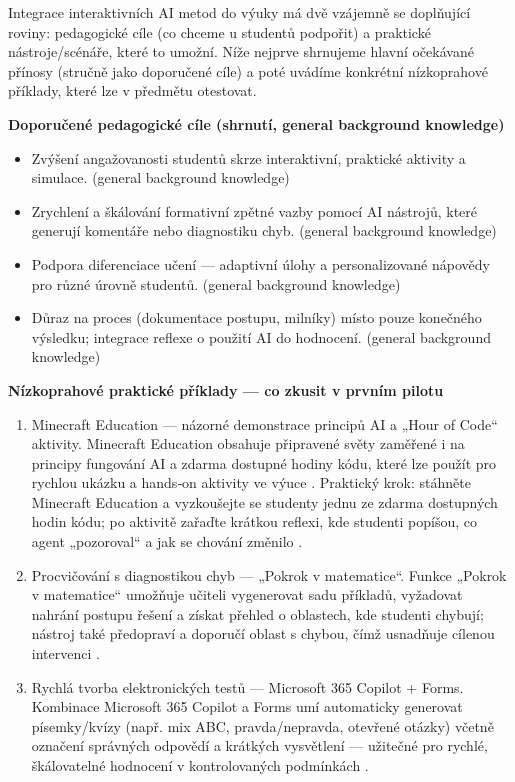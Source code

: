 \documentclass{report}%
\begin{document}
%
\medskip

Integrace interaktivních AI metod do výuky má dvě vzájemně se doplňující roviny: pedagogické cíle (co chceme u studentů podpořit) a praktické nástroje/scénáře, které to umožní. Níže nejprve shrnujeme hlavní očekávané přínosy (stručně jako doporučené cíle) a poté uvádíme konkrétní nízkoprahové příklady, které lze v předmětu otestovat.

\smallskip
\textbf{Doporučené pedagogické cíle (shrnutí, general background knowledge)}  
\begin{itemize}
  \item Zvýšení angažovanosti studentů skrze interaktivní, praktické aktivity a simulace. (general background knowledge)
  \item Zrychlení a škálování formativní zpětné vazby pomocí AI nástrojů, které generují komentáře nebo diagnostiku chyb. (general background knowledge)
  \item Podpora diferenciace učení — adaptivní úlohy a personalizované nápovědy pro různé úrovně studentů. (general background knowledge)
  \item Důraz na proces (dokumentace postupu, milníky) místo pouze konečného výsledku; integrace reflexe o použití AI do hodnocení. (general background knowledge)
\end{itemize}

\smallskip
\textbf{Nízkoprahové praktické příklady — co zkusit v prvním pilotu}  

\begin{enumerate}
  \item Minecraft Education — názorné demonstrace principů AI a „Hour of Code“ aktivity.  
    Minecraft Education obsahuje připravené světy zaměřené i na principy fungování AI a zdarma dostupné hodiny kódu, které lze použít pro rychlou ukázku a hands‑on aktivity ve výuce \cite{kb_ai_101_tipu_pdf_04e4a115_page_15_2}. Praktický krok: stáhněte Minecraft Education a vyzkoušejte se studenty jednu ze zdarma dostupných hodin kódu; po aktivitě zařaďte krátkou reflexi, kde studenti popíšou, co agent „pozoroval“ a jak se chování změnilo \cite{kb_ai_101_tipu_pdf_04e4a115_page_15_2}.
  \item Procvičování s diagnostikou chyb — „Pokrok v matematice“.  
    Funkce „Pokrok v matematice“ umožňuje učiteli vygenerovat sadu příkladů, vyžadovat nahrání postupu řešení a získat přehled o oblastech, kde studenti chybují; nástroj také předopraví a doporučí oblast s chybou, čímž usnadňuje cílenou intervenci \cite{kb_ai_101_tipu_pdf_04e4a115_page_8_1}.
  \item Rychlá tvorba elektronických testů — Microsoft 365 Copilot + Forms.  
    Kombinace Microsoft 365 Copilot a Forms umí automaticky generovat písemky/kvízy (např. mix ABC, pravda/nepravda, otevřené otázky) včetně označení správných odpovědí a krátkých vysvětlení — užitečné pro rychlé, škálovatelné hodnocení v kontrolovaných podmínkách \cite{kb_ai_101_tipu_pdf_04e4a115_page_36_1}.
\end{enumerate}
\end{document}

